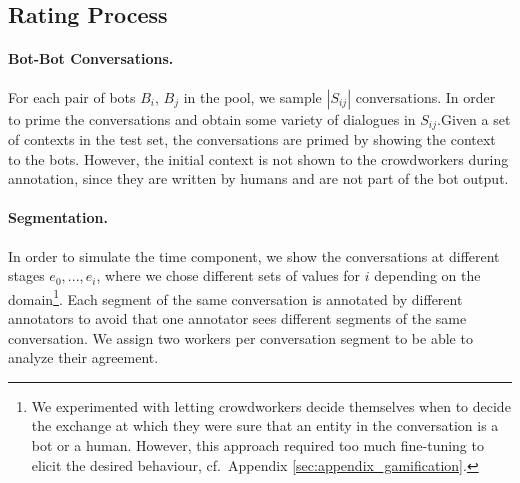 \subsection{Rating Process}\label{sec:setting}

\paragraph{Bot-Bot Conversations.} For each pair of bots $B_i$, $B_j$ in the pool, we sample $|S_{ij}|$ conversations. In order to prime the conversations and obtain some variety of dialogues in $S_{ij}$.Given a set of contexts in the test set, the conversations are primed by showing the context to the bots. However, the initial context is not shown to the crowdworkers during annotation, since they are written by humans and are not part of the bot output. %
\paragraph{Segmentation.} In order to simulate the time component, we show the conversations at different stages $e_0, ..., e_i$, where we chose different sets of values for $i$ depending on the domain\footnote{We experimented with letting crowdworkers decide themselves when to decide the exchange at which they were sure that an entity in the conversation is a bot or a human. However, this approach required too much fine-tuning to elicit the desired behaviour, cf.\ Appendix \ref{sec:appendix_gamification}.}. Each segment of the same conversation is annotated by different annotators to avoid that one annotator sees different segments of the same conversation. We assign two workers per conversation segment to be able to analyze their agreement.
